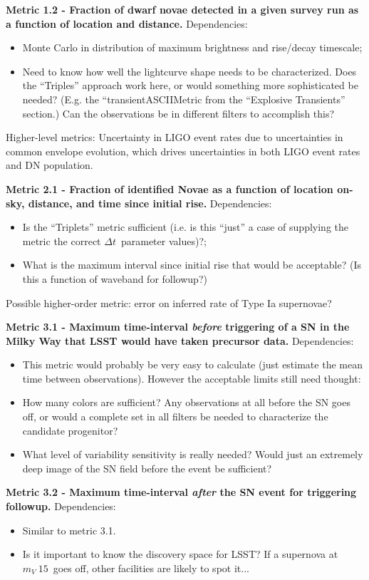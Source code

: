 {\bf Metric 1.2 - Fraction of dwarf novae detected in a given survey
  run as a function of location and distance.}
Dependencies:
\begin{itemize}
  \item Monte Carlo in distribution of maximum brightness and rise/decay timescale;
    \item Need to know how well the lightcurve shape needs to be characterized. Does the ``Triples'' approach work here, or would something more sophisticated be needed? (E.g. the ``transientASCIIMetric from the ``Explosive Transients'' section.) Can the observations be in different filters to accomplish this?
\end{itemize}
Higher-level metrics: Uncertainty in LIGO event rates due to
uncertainties in common envelope evolution, which drives uncertainties in both LIGO event rates and DN population.

{\bf Metric 2.1 - Fraction of identified Novae as a function of location on-sky, distance, and time since initial rise.}
Dependencies:
\begin{itemize}
  \item Is the ``Triplets'' metric sufficient (i.e. is this ``just'' a case of supplying the metric the correct $\Delta t$~parameter values)?;
    \item What is the maximum interval since initial rise that would be acceptable? (Is this a function of waveband for followup?)
\end{itemize}
Possible higher-order metric: error on inferred rate of Type Ia supernovae?

{\bf Metric 3.1 - Maximum time-interval {\it before} triggering of a SN in the Milky Way that LSST would have taken precursor data.}
Dependencies:
\begin{itemize}
  \item This metric would probably be very easy to calculate (just estimate the mean time between observations). However the acceptable limits still need thought:
  \item How many colors are sufficient? Any observations at all before the SN goes off, or would a complete set in all filters be needed to characterize the candidate progenitor?
    \item What level of variability sensitivity is really needed? Would just an extremely deep image of the SN field before the event be sufficient?
\end{itemize}
{\bf Metric 3.2 - Maximum time-interval {\it after} the SN event for triggering followup.}
Dependencies:
\begin{itemize}
  \item Similar to metric 3.1. 
    \item Is it important to know the discovery space for LSST? If a
      supernova at $m_V~15$~goes off, other facilities are likely to
      spot it...
\end{itemize}


